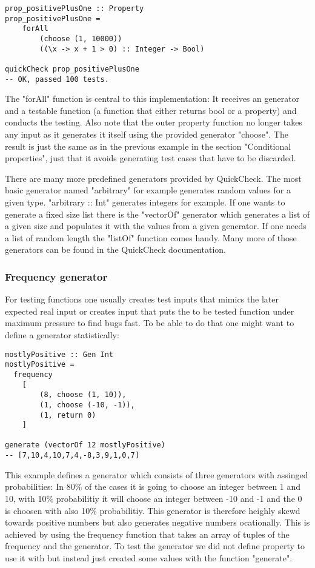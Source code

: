 \documentclass[a4paper, 12pt]{article} %
\begin{document}
\begin{verbatim}
prop_positivePlusOne :: Property
prop_positivePlusOne = 
    forAll
        (choose (1, 10000))
        ((\x -> x + 1 > 0) :: Integer -> Bool)

quickCheck prop_positivePlusOne
-- OK, passed 100 tests.
\end{verbatim}

The "forAll" function is central to this implementation: It receives an generator and a testable function (a function that either returns bool or a property) and conducts the testing. Also note that the outer property function no longer takes any input as it generates it itself using the provided generator "choose". The result is just the same as in the previous example in the section "Conditional properties", just that it avoids generating test cases that have to be discarded.

There are many more predefined generators provided by QuickCheck. The most basic generator named "arbitrary" for example generates random values for a given type. "arbitrary :: Int" generates integers for example. If one wants to generate a fixed size list there is the "vectorOf" generator which generates a list of a given size and populates it with the values from a given generator. If one needs a list of random length the "listOf" function comes handy. Many more of those generators can be found in the QuickCheck documentation. \cite{documentation}

\subsubsection{Frequency generator}

For testing functions one usually creates test inputs that mimics the later expected real input or creates input that puts the to be tested function under maximum pressure to find bugs fast. To be able to do that one might want to define a generator statistically:

\begin{verbatim}
mostlyPositive :: Gen Int
mostlyPositive =
  frequency
    [ 
        (8, choose (1, 10)),
        (1, choose (-10, -1)),
        (1, return 0)
    ]

generate (vectorOf 12 mostlyPositive) 
-- [7,10,4,10,7,4,-8,3,9,1,0,7]
\end{verbatim}

This example defines a generator which consists of three generators with assinged probabilities: In 80\% of the cases it is going to choose an integer between 1 and 10, with 10\% probabilitiy it will choose an integer between -10 and -1 and the 0 is choosen with also 10\% probabilitiy. This generator is therefore heighly skewd towards positive numbers but also generates negative numbers ocationally. This is achieved by using the frequency function that takes an array of tuples of the frequency and the generator. To test the generator we did not define property to use it with but instead just created some values with the function "generate".
\end{document}
